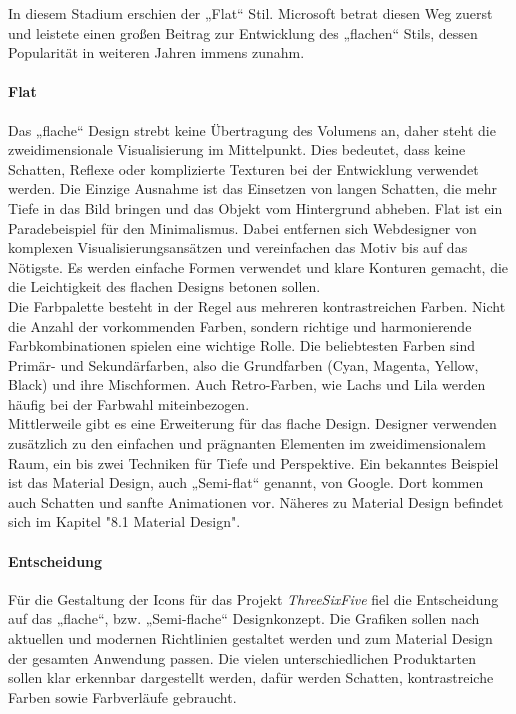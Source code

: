 In diesem Stadium erschien der „Flat“ Stil. Microsoft betrat diesen Weg zuerst und leistete einen großen Beitrag zur Entwicklung des „flachen“ Stils, dessen Popularität in weiteren Jahren immens zunahm.


\paragraph{Flat}
Das „flache“ Design\cite{dasflacheDesign} strebt keine Übertragung des Volumens an, daher steht die zweidimensionale Visualisierung im Mittelpunkt. Dies bedeutet, dass keine Schatten, Reflexe oder komplizierte Texturen bei der Entwicklung verwendet werden. Die Einzige Ausnahme ist das Einsetzen von langen Schatten, die mehr Tiefe in das Bild bringen und das Objekt vom Hintergrund abheben. Flat ist ein Paradebeispiel für den Minimalismus. Dabei entfernen sich Webdesigner von komplexen Visualisierungsansätzen und vereinfachen das Motiv bis auf das Nötigste. Es werden einfache Formen verwendet und klare Konturen gemacht, die die Leichtigkeit des flachen Designs betonen sollen. \\

Die Farbpalette besteht in der Regel aus mehreren kontrastreichen Farben. Nicht die Anzahl der vorkommenden Farben, sondern richtige und harmonierende Farbkombinationen spielen eine wichtige Rolle. Die beliebtesten Farben sind Primär- und Sekundärfarben, also die Grundfarben (Cyan, Magenta, Yellow, Black) und ihre Mischformen. Auch Retro-Farben, wie Lachs und Lila werden häufig bei der Farbwahl miteinbezogen.\\

Mittlerweile gibt es eine Erweiterung für das flache Design. Designer verwenden zusätzlich zu den einfachen und prägnanten Elementen im zweidimensionalem Raum, ein bis zwei Techniken für Tiefe und Perspektive. Ein bekanntes Beispiel ist das Material Design, auch „Semi-flat“ genannt, von Google. Dort kommen auch Schatten und sanfte Animationen vor. Näheres zu Material Design befindet sich im Kapitel "8.1 Material Design". 

\paragraph{Entscheidung} 
Für die Gestaltung der Icons für das Projekt \textit{ThreeSixFive} fiel die Entscheidung auf das „flache“, bzw. „Semi-flache“ Designkonzept. Die Grafiken sollen nach aktuellen und modernen Richtlinien gestaltet werden und zum Material Design der gesamten Anwendung passen. Die vielen unterschiedlichen Produktarten sollen klar erkennbar dargestellt werden, dafür werden Schatten, kontrastreiche Farben sowie Farbverläufe gebraucht. 

